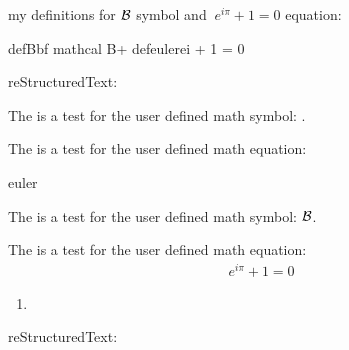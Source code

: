 \documentclass[letterpaper,11pt,english]{sphinxmanual}
\def\B{{\bf \mathcal B}}
\def\euler{\ e^{i\pi} + 1 = 0}
\begin{document}
my definitions for \(\B\) symbol and \(\euler\) equation:

\begin{sphinxVerbatim}[commandchars=\\\{\}]
\PYGZsq{}defBbf mathcal B\PYGZsq{}+ 
\PYGZsq{}defeulerei + 1 = 0\PYGZsq{}
\end{sphinxVerbatim}

reStructuredText:

\begin{sphinxVerbatim}[commandchars=\\\{\}]
The is a test for the user defined math symbol: .

The is a test for the user defined math equation:

 

        \PYGZbs{}euler
\end{sphinxVerbatim}

The is a test for the user defined math symbol: \(\B\).

The is a test for the user defined math equation:
\begin{equation*}
\begin{split}\euler\end{split}
\end{equation*}\begin{enumerate}
\def\theenumi{\arabic{enumi}}
\def\labelenumi{\theenumi .}
\makeatletter\def\p@enumii{\p@enumi \theenumi .}\makeatother
\setcounter{enumi}{3}
\item {} 

\end{enumerate}

reStructuredText:
\end{document}
